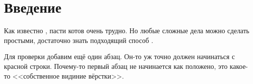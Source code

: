 \section{Введение}

Как известно \cite[гл.~1]{Reynvoter2019}, пасти котов очень трудно. Но любые сложные дела можно сделать простыми, достаточно знать подходящий способ \cite{Ilyahov2019, Dorofeev2017}.

Для проверки добавим ещё один абзац. Он-то уж точно должен начинаться с красной строки. Почему-то первый абзац не начинается как положено, это какое-то <<собственное видиние вёрстки>>.

\clearpage